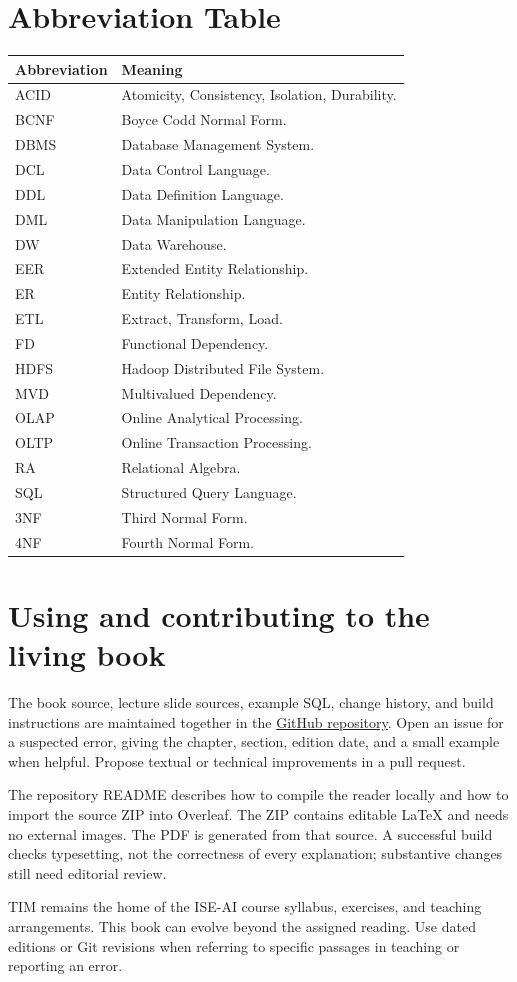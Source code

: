 \documentclass[11pt,a4paper,openany]{book}
\begin{document}
\chapter{Abbreviation Table}
\begin{longtable}{p{}p{}}
\toprule
\textbf{Abbreviation} & \textbf{Meaning}\\
\midrule
ACID & Atomicity, Consistency, Isolation, Durability.\\
BCNF & Boyce Codd Normal Form.\\
DBMS & Database Management System.\\
DCL & Data Control Language.\\
DDL & Data Definition Language.\\
DML & Data Manipulation Language.\\
DW & Data Warehouse.\\
EER & Extended Entity Relationship.\\
ER & Entity Relationship.\\
ETL & Extract, Transform, Load.\\
FD & Functional Dependency.\\
HDFS & Hadoop Distributed File System.\\
MVD & Multivalued Dependency.\\
OLAP & Online Analytical Processing.\\
OLTP & Online Transaction Processing.\\
RA & Relational Algebra.\\
SQL & Structured Query Language.\\
3NF & Third Normal Form.\\
4NF & Fourth Normal Form.\\
\bottomrule
\end{longtable}

\chapter{Using and contributing to the living book}
The book source, lecture slide sources, example SQL, change history, and build instructions are maintained together in the \href{https://github.com/emmerichmtm/DatabasesAndDataManagement}{GitHub repository}. Open an issue for a suspected error, giving the chapter, section, edition date, and a small example when helpful. Propose textual or technical improvements in a pull request.

The repository README describes how to compile the reader locally and how to import the source ZIP into Overleaf. The ZIP contains editable LaTeX and needs no external images. The PDF is generated from that source. A successful build checks typesetting, not the correctness of every explanation; substantive changes still need editorial review.

TIM remains the home of the ISE-AI course syllabus, exercises, and teaching arrangements. This book can evolve beyond the assigned reading. Use dated editions or Git revisions when referring to specific passages in teaching or reporting an error.

\printindex
\end{document}
